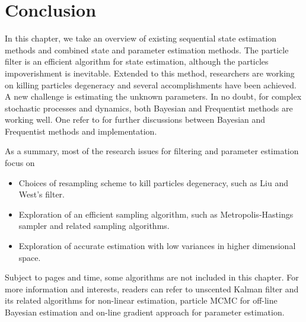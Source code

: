 \section{Conclusion}

In this chapter, we take an overview of existing sequential state estimation methods and combined state and parameter estimation methods. The particle filter is an efficient algorithm for state estimation, although the particles impoverishment is inevitable. Extended to this method, researchers are working on killing particles degeneracy and several accomplishments have been achieved. A new challenge is estimating the unknown parameters. In no doubt, for complex stochastic processes and dynamics, both Bayesian and Frequentist methods are working well. One refer to \citep{wakefield2013bayesian} for further discussions between Bayesian and Frequentist methods and implementation. 

As a summary, most of the research issues for filtering and parameter estimation focus on 
\begin{itemize}\itemsep0em 
\item Choices of resampling scheme to kill particles degeneracy, such as Liu and West's filter.
\item Exploration of an efficient sampling algorithm, such as Metropolis-Hastings sampler and related sampling algorithms. 
\item Exploration of accurate estimation with low variances in higher dimensional space. 
\end{itemize}

Subject to pages and time, some algorithms are not included in this chapter. For more information and interests, readers can refer to unscented Kalman filter \citep{wan2000unscented} and its related algorithms for non-linear estimation, particle MCMC \citep{andrieu2010particle} for off-line Bayesian estimation and on-line gradient approach \citep{poyiadjis2005maximum} for parameter estimation. 



